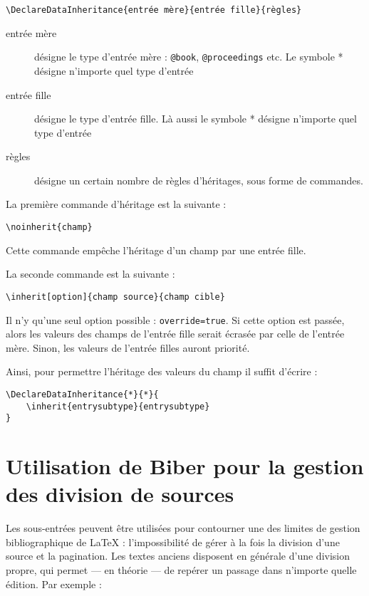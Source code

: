 \begin{verbatim}
\DeclareDataInheritance{entrée mère}{entrée fille}{règles}
\end{verbatim}

\begin{description}
\item[entrée mère]désigne le type d'entrée mère : \verb|@book|, \verb|@proceedings| etc. Le symbole * désigne n'importe quel type d'entrée
\item[entrée fille]désigne le type d'entrée fille. Là aussi le symbole * désigne n'importe quel type d'entrée
\item[règles] désigne un certain nombre de règles d'héritages, sous forme de commandes.
\end{description}

La première commande d'héritage est la suivante :

\begin{verbatim}
\noinherit{champ}
\end{verbatim}

Cette commande empêche l'héritage d'un champ par une entrée fille.

La seconde commande est la suivante :

\begin{verbatim}
\inherit[option]{champ source}{champ cible}
\end{verbatim}

Il n'y qu'une seul option possible : \verb|override=true|. Si cette option est passée, alors les valeurs des champs de l'entrée fille serait écrasée par celle de l'entrée mère. Sinon, les valeurs de l'entrée filles auront priorité.

Ainsi, pour permettre l'héritage des valeurs du champ  il suffit d'écrire :

\begin{verbatim}
\DeclareDataInheritance{*}{*}{
	\inherit{entrysubtype}{entrysubtype}
}
\end{verbatim}

\section[Division des sources antiques]{Utilisation de Biber pour la gestion des division de sources}\label{divisionsource}

Les sous-entrées peuvent être utilisées pour contourner une des limites de gestion bibliographique de \LaTeX{} : l'impossibilité de gérer à la fois  la division d'une source et la pagination. Les textes anciens disposent en générale d'une division propre, qui permet --- en théorie ---  de repérer un passage dans n'importe quelle édition. Par exemple : 


